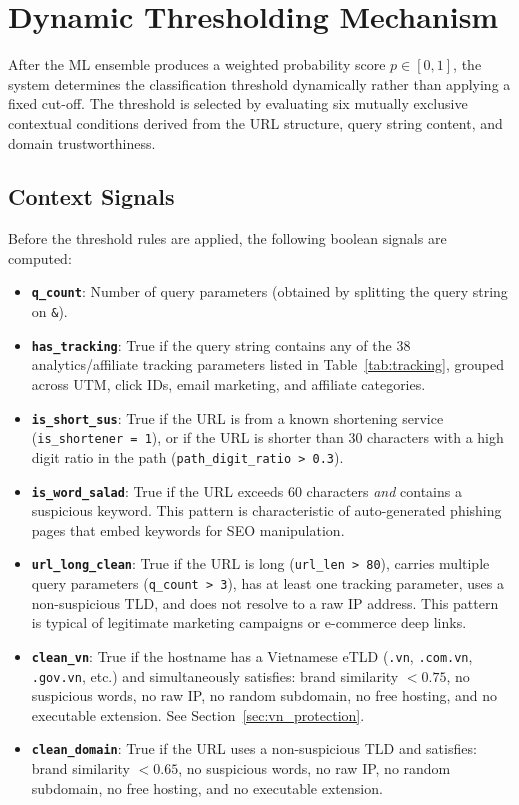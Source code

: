 \documentclass[12pt,a4paper]{article}
\begin{document}
\section{Dynamic Thresholding Mechanism}

After the ML ensemble produces a weighted probability score $p \in [0, 1]$, the system determines the classification threshold dynamically rather than applying a fixed cut-off. The threshold is selected by evaluating six mutually exclusive contextual conditions derived from the URL structure, query string content, and domain trustworthiness.

\subsection{Context Signals}

Before the threshold rules are applied, the following boolean signals are computed:
\begin{itemize}
    \item \textbf{\texttt{q\_count}}: Number of query parameters (obtained by splitting the query string on \texttt{\&}).
    \item \textbf{\texttt{has\_tracking}}: True if the query string contains any of the 38 analytics/affiliate tracking parameters listed in Table~\ref{tab:tracking}, grouped across UTM, click IDs, email marketing, and affiliate categories.
    \item \textbf{\texttt{is\_short\_sus}}: True if the URL is from a known shortening service (\texttt{is\_shortener = 1}), or if the URL is shorter than 30 characters with a high digit ratio in the path (\texttt{path\_digit\_ratio > 0.3}).
    \item \textbf{\texttt{is\_word\_salad}}: True if the URL exceeds 60 characters \textit{and} contains a suspicious keyword. This pattern is characteristic of auto-generated phishing pages that embed keywords for SEO manipulation.
    \item \textbf{\texttt{url\_long\_clean}}: True if the URL is long (\texttt{url\_len > 80}), carries multiple query parameters (\texttt{q\_count > 3}), has at least one tracking parameter, uses a non-suspicious TLD, and does not resolve to a raw IP address. This pattern is typical of legitimate marketing campaigns or e-commerce deep links.
    \item \textbf{\texttt{clean\_vn}}: True if the hostname has a Vietnamese eTLD (\texttt{.vn}, \texttt{.com.vn}, \texttt{.gov.vn}, etc.) and simultaneously satisfies: brand similarity $< 0.75$, no suspicious words, no raw IP, no random subdomain, no free hosting, and no executable extension. See Section~\ref{sec:vn_protection}.
    \item \textbf{\texttt{clean\_domain}}: True if the URL uses a non-suspicious TLD and satisfies: brand similarity $< 0.65$, no suspicious words, no raw IP, no random subdomain, no free hosting, and no executable extension.
\end{itemize}
\end{document}

